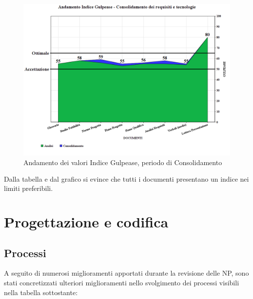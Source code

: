 \documentclass[openany,12pt,a4paper]{report}
\begin{document}
\begin{itemize}
	\begin{figure}[H]
		\includegraphics[scale=0.5]{verifica-consolidamento-gulpease}
		\centering
		\caption{Andamento dei valori Indice Gulpease, periodo di Consolidamento}
	\end{figure}
	
	Dalla tabella e dal grafico si evince che tutti i documenti presentano un indice nei limiti preferibili.	
\end{itemize}


\section{Progettazione e codifica}

\subsection{Processi}

A seguito di numerosi miglioramenti apportati durante la revisione delle NP, sono stati concretizzati ulteriori miglioramenti nello svolgimento dei processi visibili nella tabella sottostante:

\newpage
\end{document}
